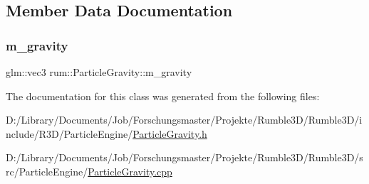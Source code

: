 \subsection{Member Data Documentation}
\mbox{\label{classrum_1_1_particle_gravity_a9fbc86ccd5d18e93626a6c4b0fc3b5e2}} 
\subsubsection{\texorpdfstring{m\+\_\+gravity}{m\_gravity}}
{\footnotesize\ttfamily glm\+::vec3 rum\+::\+Particle\+Gravity\+::m\+\_\+gravity\hspace{0.3cm}{\ttfamily [protected]}}



The documentation for this class was generated from the following files\+:\begin{DoxyCompactItemize}
\item 
D\+:/\+Library/\+Documents/\+Job/\+Forschungsmaster/\+Projekte/\+Rumble3\+D/\+Rumble3\+D/include/\+R3\+D/\+Particle\+Engine/\mbox{\hyperlink{_particle_gravity_8h}{Particle\+Gravity.\+h}}\item 
D\+:/\+Library/\+Documents/\+Job/\+Forschungsmaster/\+Projekte/\+Rumble3\+D/\+Rumble3\+D/src/\+Particle\+Engine/\mbox{\hyperlink{_particle_gravity_8cpp}{Particle\+Gravity.\+cpp}}\end{DoxyCompactItemize}
